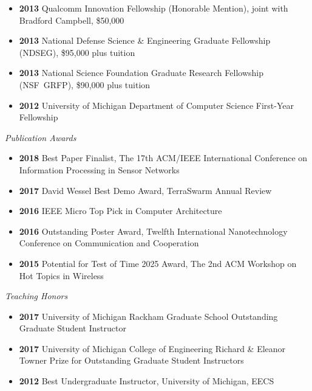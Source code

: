 \documentclass{article}
\begin{document}
\begin{itemize}
  \item[] \textbf{2013} Qualcomm Innovation Fellowship (Honorable Mention), joint with Bradford Campbell, \$50,000
  \item[] \textbf{2013} National Defense Science \& Engineering Graduate Fellowship (NDSEG), \$95,000 plus tuition
  \item[] \textbf{2013} National Science Foundation Graduate Research Fellowship (NSF~GRFP), \$90,000 plus tuition
  \item[] \textbf{2012} University of Michigan Department of Computer Science First-Year Fellowship
\end{itemize}

\emph{Publication Awards}

\begin{itemize}
  \item[] \textbf{2018} Best Paper Finalist, The 17th ACM/IEEE International Conference on Information Processing in Sensor Networks
  \item[] \textbf{2017} David Wessel Best Demo Award, TerraSwarm Annual Review
  \item[] \textbf{2016} IEEE Micro Top Pick in Computer Architecture
  \item[] \textbf{2016} Outstanding Poster Award, Twelfth International Nanotechnology Conference on Communication and Cooperation
  \item[] \textbf{2015} Potential for Test of Time 2025 Award, The 2nd ACM Workshop on Hot Topics in Wireless
\end{itemize}

\emph{Teaching Honors}

\begin{itemize}
  \item[] \textbf{2017} University of Michigan Rackham Graduate School Outstanding Graduate Student Instructor
  \item[] \textbf{2017} University of Michigan College of Engineering Richard \& Eleanor Towner Prize for Outstanding Graduate Student Instructors
  \item[] \textbf{2012} Best Undergraduate Instructor, University of Michigan, EECS
\end{itemize}
\end{document}
